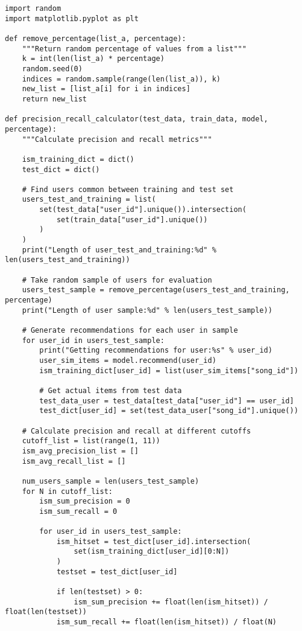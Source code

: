 \documentclass[12pt,a4paper]{article}
\begin{document}
\begin{lstlisting}[caption=Precision-Recall Evaluation Implementation]
import random
import matplotlib.pyplot as plt

def remove_percentage(list_a, percentage):
    """Return random percentage of values from a list"""
    k = int(len(list_a) * percentage)
    random.seed(0)
    indices = random.sample(range(len(list_a)), k)
    new_list = [list_a[i] for i in indices]
    return new_list

def precision_recall_calculator(test_data, train_data, model, percentage):
    """Calculate precision and recall metrics"""
    
    ism_training_dict = dict()
    test_dict = dict()

    # Find users common between training and test set
    users_test_and_training = list(
        set(test_data["user_id"].unique()).intersection(
            set(train_data["user_id"].unique())
        )
    )
    print("Length of user_test_and_training:%d" % len(users_test_and_training))

    # Take random sample of users for evaluation
    users_test_sample = remove_percentage(users_test_and_training, percentage)
    print("Length of user sample:%d" % len(users_test_sample))

    # Generate recommendations for each user in sample
    for user_id in users_test_sample:
        print("Getting recommendations for user:%s" % user_id)
        user_sim_items = model.recommend(user_id)
        ism_training_dict[user_id] = list(user_sim_items["song_id"])

        # Get actual items from test data
        test_data_user = test_data[test_data["user_id"] == user_id]
        test_dict[user_id] = set(test_data_user["song_id"].unique())

    # Calculate precision and recall at different cutoffs
    cutoff_list = list(range(1, 11))
    ism_avg_precision_list = []
    ism_avg_recall_list = []

    num_users_sample = len(users_test_sample)
    for N in cutoff_list:
        ism_sum_precision = 0
        ism_sum_recall = 0

        for user_id in users_test_sample:
            ism_hitset = test_dict[user_id].intersection(
                set(ism_training_dict[user_id][0:N])
            )
            testset = test_dict[user_id]

            if len(testset) > 0:
                ism_sum_precision += float(len(ism_hitset)) / float(len(testset))
            ism_sum_recall += float(len(ism_hitset)) / float(N)


\end{lstlisting}
\end{document}
